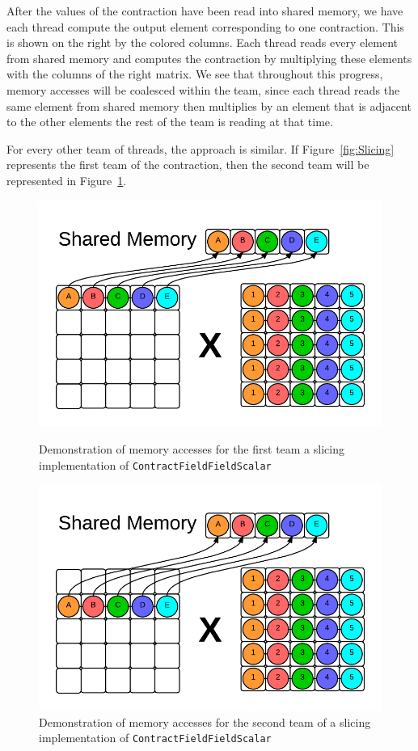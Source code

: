     After the values of the contraction have been read into shared memory, we
have each thread compute the output element corresponding to one contraction.
This is shown on the right by the colored columns. Each thread reads every
element from shared memory and computes the contraction by multiplying these
elements with the columns of the right matrix. We see that throughout this
progress, memory accesses will be coalesced within the team, since each thread
reads the same element from shared memory then multiplies by an element that is
adjacent to the other elements the rest of the team is reading at that time. 
	
    For every other team of threads, the approach is similar. If Figure~\ref{fig:Slicing}
represents the first team of the contraction, then the second team will be
represented in Figure~\ref{fig:Slicing2}. 

\begin{figure}[H]
    \centering
    \includegraphics[scale = .55]{ContractFieldFieldScalarGraphic}
    \caption[Memory accesses -- slicing]{Demonstration of memory accesses for the first team a slicing
        implementation of \texttt{ContractFieldFieldScalar}}
    \label{fig:Slicing}

    \includegraphics[scale = .55]{ContractFieldFieldScalarGraphic2}
    \caption[Memory accesses -- slicing]{Demonstration of memory accesses for
    the second team of a slicing implementation of
    \texttt{ContractFieldFieldScalar}}
    \label{fig:Slicing2}
\end{figure}

